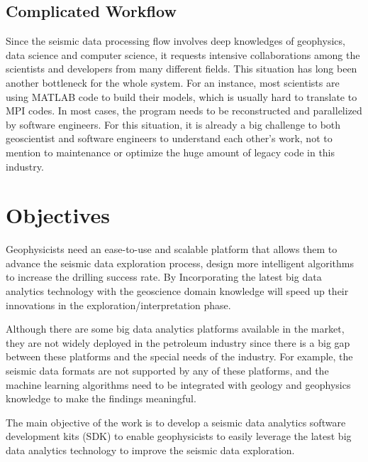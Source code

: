 \subsection{Complicated Workflow}

Since the seismic data processing flow involves deep knowledges of geophysics, data science and computer science, it requests intensive collaborations among the scientists and developers from many different fields. This situation has long been another bottleneck for the whole system. For an instance, most scientists are using MATLAB code to build their models, which is usually hard to translate to MPI codes. In most cases, the program needs to be reconstructed and parallelized by software engineers. For this situation, it is already a big challenge to both geoscientist and software engineers to understand each other's work, not to mention to maintenance or optimize the huge amount of legacy code in this industry.


\section{Objectives}

Geophysicists need an ease-to-use and scalable platform that allows them to advance the seismic data exploration process, design more intelligent algorithms to increase the drilling success rate. By Incorporating the latest big data analytics technology with the geoscience domain knowledge will speed up their innovations in the exploration/interpretation phase.

Although there are some big data analytics platforms available in the market, they are not widely deployed in the petroleum industry since there is a big gap between these platforms and the special needs of the industry. For example, the seismic data formats are not supported by any of these platforms, and the machine learning algorithms need to be integrated with geology and geophysics knowledge to make the findings meaningful.

The main objective of the work is to develop a seismic data analytics software development kits (SDK) to enable geophysicists to easily leverage the latest big data analytics technology to improve the seismic data exploration.




